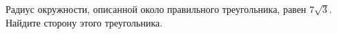 \begin{ex}
	\begin{condition}
		Радиус окружности, описанной около правильного треугольника, равен \( 7\sqrt{3} \). Найдите сторону этого треугольника.
	\end{condition}
\end{ex}